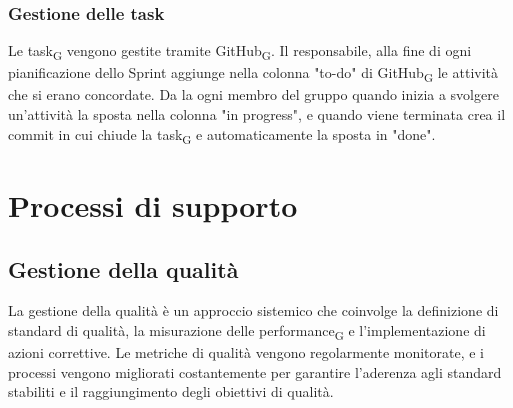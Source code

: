\documentclass{article}
\begin{document}
\subsubsection{Gestione delle task}
Le task\textsubscript{G} vengono gestite tramite GitHub\textsubscript{G}. Il responsabile, alla fine di ogni pianificazione dello Sprint aggiunge nella colonna "to-do" di GitHub\textsubscript{G} le attività che si erano concordate. Da la ogni membro del gruppo quando inizia a svolgere un'attività la sposta nella colonna "in progress", e quando viene terminata crea il commit in cui chiude la task\textsubscript{G} e automaticamente la sposta in "done".  

\section{Processi di supporto}

\subsection{Gestione della qualità}
La gestione della qualità è un approccio sistemico che coinvolge la definizione di standard di qualità, la misurazione delle performance\textsubscript{G} e l'implementazione di azioni correttive. Le metriche di qualità vengono regolarmente monitorate, e i processi vengono migliorati costantemente per garantire l'aderenza agli standard stabiliti e il raggiungimento degli obiettivi di qualità.
\end{document}
